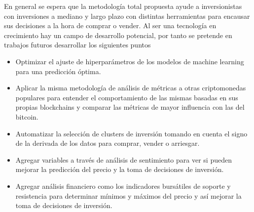 En general se espera que la metodología total propuesta ayude a inversionistas con inversiones a mediano y largo plazo con distintas herramientas para encausar sus decisiones a la hora de comprar o vender. Al ser una tecnología en crecimiento hay un campo de desarrollo potencial, por tanto se pretende en trabajos futuros desarrollar los siguientes puntos

\begin{itemize}
	\item Optimizar el ajuste de hiperparámetros de los modelos de machine learning para una predicción óptima.
	\item Aplicar la misma metodología de análisis de métricas a otras criptomonedas populares para entender el comportamiento de las mismas basadas en sus propias blockchains y comparar las métricas de mayor influencia con las del bitcoin.
	\item Automatizar la selección de clusters de inversión tomando en cuenta el signo de la derivada de los datos para comprar, vender o arriesgar.
	\item Agregar variables a través de análisis de sentimiento para ver si pueden mejorar la predicción del precio y la toma de decisiones de inversión.
	\item Agregar análisis financiero como los indicadores bursátiles de soporte y resistencia para determinar mínimos y máximos del precio y así mejorar la toma de decisiones de inversión. 
\end{itemize}
















